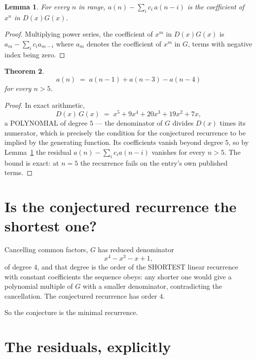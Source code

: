 \documentclass[11pt,a4paper]{article}
\theoremstyle{plain}
\newtheorem{theorem}{Theorem}
\newtheorem{lemma}[theorem]{Lemma}
\theoremstyle{definition}
\begin{document}
\begin{lemma}\label{lem:key}
For every $n$ in range, $a(n)-\sum_i c_i\,a(n-i)$ is the coefficient of $x^{n}$ in
$D(x)G(x)$.
\end{lemma}

\begin{proof}
Multiplying power series, the coefficient of $x^{m}$ in $D(x)G(x)$ is
$a_m-\sum_i c_i a_{m-i}$ where $a_m$ denotes the coefficient of $x^{m}$ in $G$, terms with
negative index being zero.
\end{proof}

\begin{theorem}
\[
a(n)\;=\;a(n-1) + a(n-3) - a(n-4)
\]
for every $n>5$.
\end{theorem}

\begin{proof}
In exact arithmetic,
\[
D(x)\,G(x)\;=\;x^{5} + 9 x^{4} + 20 x^{3} + 19 x^{2} + 7 x,
\]
a POLYNOMIAL of degree $5$ --- the denominator of $G$ divides $D(x)$ times its numerator,
which is precisely the condition for the conjectured recurrence to be implied by the
generating function. Its coefficients vanish beyond degree $5$, so by
Lemma~\ref{lem:key} the residual $a(n)-\sum_ic_ia(n-i)$ vanishes for every
$n>5$. The bound is exact: at $n=5$ the recurrence fails on the entry's own published terms.
\end{proof}

\section{Is the conjectured recurrence the shortest one?}

Cancelling common factors, $G$ has reduced denominator
\[
x^{4} - x^{3} - x + 1,
\]
of degree $4$, and that degree is the order of the SHORTEST linear recurrence with
constant coefficients the sequence obeys: any shorter one would give a polynomial multiple of
$G$ with a smaller denominator, contradicting the cancellation. The conjectured recurrence has
order $4$.

So the conjecture is the minimal recurrence.

\section{The residuals, explicitly}
\end{document}
